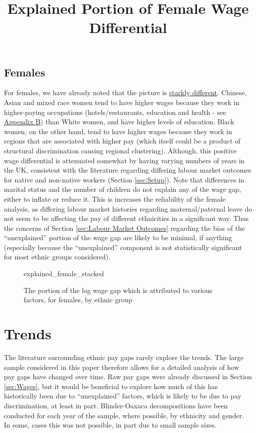 \documentclass[class=article, crop=false]{standalone}
\begin{document}
\subsection{Females}
\label{sec:females_explained}
For females, we have already noted that the picture is \hyperref[sec:results]{starkly different}. Chinese, Asian and mixed race women tend to have higher wages because they work in higher-paying occupations (hotels/restaurants, education and health - see \hyperref[sec:appendixB]{Appendix B}) than White women, and have higher levels of education. Black women, on the other hand, tend to have higher wages because they work in regions that are associated with higher pay (which itself could be a product of structural discrimination causing regional clustering). Although, this positive wage differential is attenuated somewhat by having varying numbers of years in the UK, consistent with the literature regarding differing labour market outcomes for native and non-native workers (Section \ref{sec:Setup}). Note that differences in marital status and the number of children do not explain any of the wage gap, either to inflate or reduce it. This is increases the reliability of the female analysis, as differing labour market histories regarding maternal/paternal leave do not seem to be affecting the pay of different ethnicities in a significant way. Thus the concerns of Section \ref{sec:Labour Market Outcomes} regarding the bias of the \enquote{unexplained} portion of the wage gap are likely to be minimal, if anything (especially because the \enquote{unexplained} component is not statistically significant for most ethnic groups considered).

\begin{figure}[]
\centering
    \title{Explained Portion of Female Wage Differential}
    {explained_female_stacked}
    \caption{The portion of the log wage gap which is attributed to various factors, for females, by ethnic group}
    \label{fig:explained_female_stacked}
\end{figure}

\section{Trends}
\label{sec:time_trends}
The literature surrounding ethnic pay gaps rarely explore the trends. The large sample considered in this paper therefore allows for a detailed analysis of how pay gaps have changed over time. Raw pay gaps were already discussed in Section \ref{sec:Wages}, but it would be beneficial to explore how much of this has historically been due to \enquote{unexplained} factors, which is likely to be due to pay discrimination, at least in part. Blinder-Oaxaca decompositions have been conducted for each year of the sample, where possible, by ethnicity and gender. In some, cases this was not possible, in part due to small sample sizes.
\end{document}
